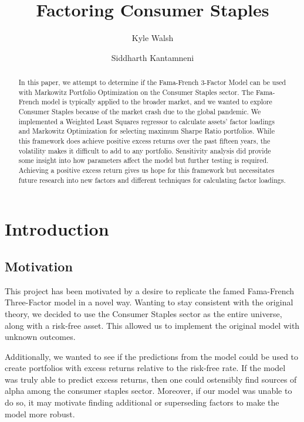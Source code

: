 \documentclass[final]{article}
\title{Factoring Consumer Staples}
\author[$\dag$]{Kyle Walsh}
\author[$\ddag$]{Siddharth Kantamneni}
\affil[$\dag$]{\small kew96@cornell.edu}
\affil[$\ddag$]{\small skk82@cornell.edu}
\date{}
\begin{document}
\maketitle

\begin{abstract}
\hspace{\parindent}In this paper, we attempt to determine if the Fama-French 3-Factor Model can be used with Markowitz Portfolio Optimization on the Consumer Staples sector. The Fama-French model is typically applied to the broader market, and we wanted to explore Consumer Staples because of the market crash due to the global pandemic. We implemented a Weighted Least Squares regressor to calculate assets' factor loadings and Markowitz Optimization for selecting maximum Sharpe Ratio portfolios. While this framework does achieve positive excess returns over the past fifteen years, the volatility makes it difficult to add to any portfolio. Sensitivity analysis did provide some insight into how parameters affect the model but further testing is required. Achieving a positive excess return gives us hope for this framework but necessitates future research into new factors and different techniques for calculating factor loadings.

\end{abstract}


\section{Introduction}

\subsection{Motivation}
\hspace{\parindent} This project has been motivated by a desire to replicate the famed Fama-French Three-Factor model in a novel way. Wanting to stay consistent with the original theory, we decided to use the Consumer Staples sector as the entire universe, along with a risk-free asset. This allowed us to implement the original model with unknown outcomes.

Additionally, we wanted to see if the predictions from the model could be used to create portfolios with excess returns relative to the risk-free rate. If the model was truly able to predict excess returns, then one could ostensibly find sources of alpha among the consumer staples sector. Moreover, if our model was unable to do so, it may motivate finding additional or superseding factors to make the model more robust.
\end{document}
